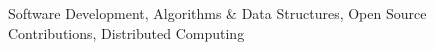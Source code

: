 

\begin{cvparagraph}

Software Development, Algorithms \& Data Structures, Open Source Contributions, Distributed Computing
\end{cvparagraph}
